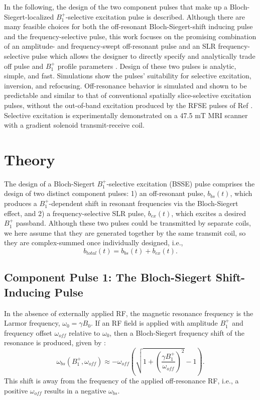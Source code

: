 \documentclass[a4paper,12pt]{article}
\newcommand{\bfullt}{b_{total}(t)}
\newcommand{\bext}{b_{ex}(t)}
\newcommand{\bbst}{b_{bs}(t)}
\begin{document}
\par In the following, the design of the two component pulses that make up a Bloch-Siegert-localized $B_1^+$-selective excitation pulse is described. 
Although there are many feasible choices for both the off-resonant Bloch-Siegert-shift inducing pulse and the frequency-selective pulse, 
this work focuses on the promising combination of an amplitude- and frequency-swept off-resonant pulse 
and an SLR frequency-selective pulse which allows the designer to directly specify and 
analytically trade off pulse and $B_1^+$ profile parameters \cite{Pauly1991ParameterAlgorithm}. 
Design of these two pulses is analytic, simple, and fast. 
Simulations show the pulses' suitability for selective excitation, inversion, and refocusing. 
Off-resonance behavior is simulated and shown to be predictable and similar to that of conventional spatially slice-selective excitation pulses, 
without the out-of-band excitation produced by the RFSE pulses of Ref \cite{Grissom2014B1+-selectiveAlgorithm}. 
Selective excitation is experimentally demonstrated on a 47.5 mT MRI scanner 
with a gradient solenoid transmit-receive coil.

\section*{Theory}
The design of a Bloch-Siegert $B_1^+$-selective excitation (BSSE) pulse comprises the design of two distinct component pulses: 
1) an off-resonant pulse, $\bbst$, which produces a $B_1^+$-dependent shift in resonant frequencies via the Bloch-Siegert effect, 
and 2) a frequency-selective SLR pulse, $\bext$, which excites a desired $B_1^+$ passband.
Although these two pulses could be transmitted by separate coils, 
we here assume that they are generated together by the same transmit coil, 
so they are complex-summed once individually designed, i.e.,
\begin{equation*}
\bfullt = \bbst + \bext.
\end{equation*}

\subsection*{Component Pulse 1: The Bloch-Siegert Shift-Inducing Pulse} 
In the absence of externally applied RF,
the magnetic resonance frequency is the Larmor frequency, $\omega_0 = \gamma B_0$. 
If an RF field is applied with amplitude $B_1^+$ and frequency offset 
$\omega_{off}$ relative to $\omega_0$, 
then a Bloch-Siegert frequency shift of the resonance is produced, given by \cite{Ramsey1955}:
\begin{equation}
\omega_{bs}(B_1^+, \omega_{off}) \approx -\omega_{off}\left(\sqrt{1+\left(\frac{\gamma B_1^+}{\omega_{off}}\right)^2}-1\right).
\label{eq:bsshift}
\end{equation}
This shift is away from the frequency of the applied off-resonance RF, i.e.,
a positive $\omega_{off}$ results in a negative $\omega_{bs}$.
\end{document}
